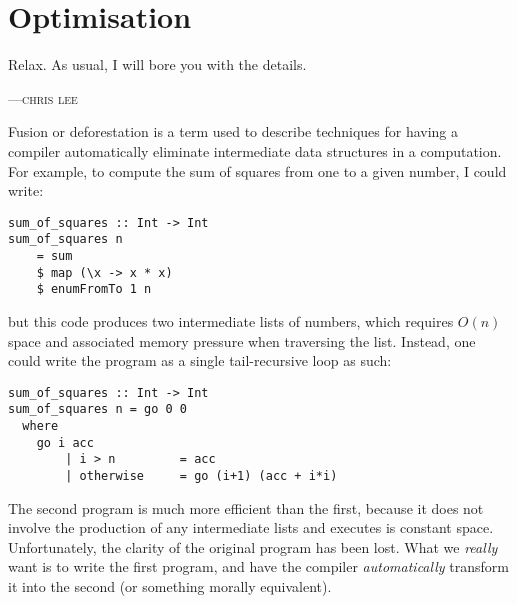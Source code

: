 %
%

\chapter{Optimisation}
\epigraph{Relax. As usual, I will bore you with the details.}%
{\textsc{---chris lee}}

Fusion or deforestation is a term used to describe techniques for having a
compiler automatically eliminate intermediate data structures in a computation.
For example, to compute the sum of squares from one to a given number, I could
write:
%
\begin{lstlisting}[style=haskell]
sum_of_squares :: Int -> Int
sum_of_squares n
    = sum
    $ map (\x -> x * x)
    $ enumFromTo 1 n
\end{lstlisting}
%
but this code produces two intermediate lists of numbers, which requires $O(n)$
space and associated memory pressure when traversing the list. Instead, one
could write the program as a single tail-recursive loop as such:
%
\begin{lstlisting}[style=haskell]
sum_of_squares :: Int -> Int
sum_of_squares n = go 0 0
  where
    go i acc
        | i > n         = acc
        | otherwise     = go (i+1) (acc + i*i)
\end{lstlisting}
%
The second program is much more efficient than the first, because it does not
involve the production of any intermediate lists and executes is constant space.
Unfortunately, the clarity of the original program has been lost. What we
\emph{really} want is to write the first program, and have the compiler
\emph{automatically} transform it into the second (or something morally
equivalent).


